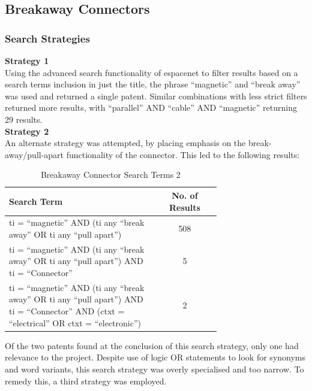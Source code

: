 \documentclass [12pt]{article}
\begin{document}

\subsection{Breakaway Connectors}\label{sec:breakaway_connectors}
\subsubsection{Search Strategies}
\textbf{Strategy 1}\\
Using the advanced search functionality of espacenet to filter results based on a search terms inclusion in just the title, the phrase “magnetic” and “break away” was used and returned a single patent.
Similar combinations with less strict filters returned more results, with “parallel” AND “cable” AND “magnetic” returning 29 results. \\
\textbf{Strategy 2}\\
An alternate strategy was attempted, by placing emphasis on the break-away/pull-apart functionality of the connector. This led to the following results:

\begin{table}[H]
    \centering
    \setlength{\arrayrulewidth}{1.5pt}
    \begin{tabular}{|p{0.7\linewidth}|c|}
    \hline
    \cellcolor{gray!40}Search Term & \cellcolor{gray!40}No. of Results \\
    \hline
    ti = “magnetic” AND (ti any “break away” OR ti any “pull apart”) & 508 \\
    \hline
    ti = “magnetic” AND (ti any “break away” OR ti any “pull apart”) AND ti = “Connector” & 5 \\
    \hline
    ti = “magnetic” AND (ti any “break away” OR ti any “pull apart”) AND ti = “Connector” AND (ctxt = “electrical” OR ctxt = “electronic”) & 2 \\
    \hline
    \end{tabular}
    \caption{Breakaway Connector Search Terms 2}
    \label{table:breakaway_connector_search_strat_2}
\end{table}

Of the two patents found at the conclusion of this search strategy, only one had relevance to the project.
Despite use of logic OR statements to look for synonyms and word variants, this search strategy was overly specialised and too narrow.
To remedy this, a third strategy was employed.\\
\end{document}
